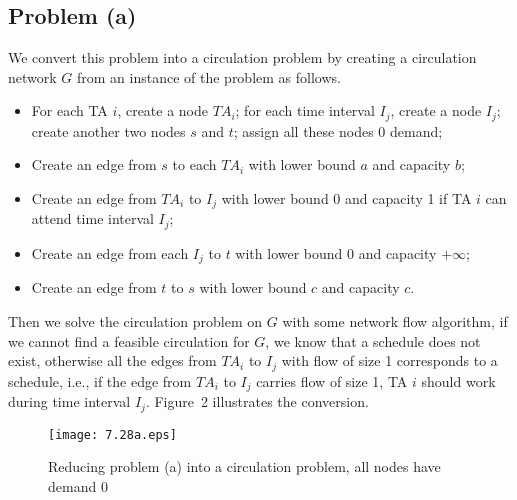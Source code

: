 \documentclass[12pt,letterpaper]{article}
\begin{document}
\subsection*{Problem (a)}
We convert this problem into a circulation problem by creating a circulation network $G$ from an instance of the problem as follows.
\begin{itemize}
\item For each TA $i$, create a node $TA_i$; for each time interval $I_j$, create a node $I_j$; create another two nodes $s$ and $t$; assign all these nodes 0 demand;
\item Create an edge from $s$ to each $TA_i$ with lower bound $a$ and capacity $b$;
\item Create an edge from $TA_i$ to $I_j$ with lower bound 0 and capacity 1 if TA $i$ can attend time interval $I_j$;
\item Create an edge from each $I_j$ to $t$ with lower bound 0 and capacity $+\infty$;
\item Create an edge from $t$ to $s$ with lower bound $c$ and capacity $c$.
\end{itemize}
Then we solve the circulation problem on $G$ with some network flow algorithm, if we cannot find a feasible circulation for $G$, we know that a schedule does not exist, otherwise all the edges from $TA_i$ to $I_j$ with flow of size 1 corresponds to a schedule, i.e., if the edge from $TA_i$ to $I_j$ carries flow of size 1, TA $i$ should work during time interval $I_j$. Figure~2 illustrates the conversion.
\begin{figure}
\begin{center}
\texttt{[image: 7.28a.eps]}
\caption{Reducing problem (a) into a circulation problem, all nodes have demand 0}
\end{center}
\end{figure}
\end{document}
